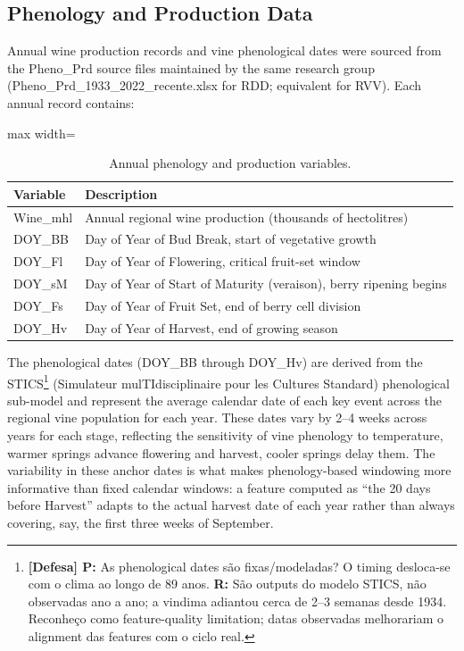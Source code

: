 \subsection{Phenology and Production Data}\label{sub:phenology_and_production_data}

Annual wine production records and vine phenological dates were sourced from the Pheno\_Prd source files maintained by the same research group (Pheno\_Prd\_1933\_2022\_recente.xlsx for RDD; equivalent for RVV). Each annual record contains:

\begin{table}[htbp]
  \centering
  \caption{Annual phenology and production variables.}\label{tab:ch3d_3}
  \small
  \begin{adjustbox}{max width=\textwidth}
    \begin{tabularx}{\textwidth}{l|X}
  \toprule
  Variable & Description \\
  \midrule
  Wine\_mhl & Annual regional wine production (thousands of hectolitres) \\
  DOY\_BB & Day of Year of Bud Break, start of vegetative growth \\
  DOY\_Fl & Day of Year of Flowering, critical fruit-set window \\
  DOY\_sM & Day of Year of Start of Maturity (veraison), berry ripening begins \\
  DOY\_Fs & Day of Year of Fruit Set, end of berry cell division \\
  DOY\_Hv & Day of Year of Harvest, end of growing season \\
  \bottomrule
\end{tabularx}
  \end{adjustbox}

\end{table}


The phenological dates (DOY\_BB through DOY\_Hv) are derived from the STICS\footnote{\textbf{[Defesa] P:} As phenological dates são fixas/modeladas? O timing desloca-se com o clima ao longo de 89 anos. \textbf{R:} São outputs do modelo STICS, não observadas ano a ano; a vindima adiantou cerca de 2--3 semanas desde 1934. Reconheço como feature-quality limitation; datas observadas melhorariam o alignment das features com o ciclo real.} (Simulateur mulTIdisciplinaire pour les Cultures Standard) phenological sub-model and represent the average calendar date of each key event across the regional vine population for each year. These dates vary by 2--4 weeks across years for each stage, reflecting the sensitivity of vine phenology to temperature, warmer springs advance flowering and harvest, cooler springs delay them. The variability in these anchor dates is what makes phenology-based windowing more informative than fixed calendar windows: a feature computed as ``the 20 days before Harvest'' adapts to the actual harvest date of each year rather than always covering, say, the first three weeks of September.

